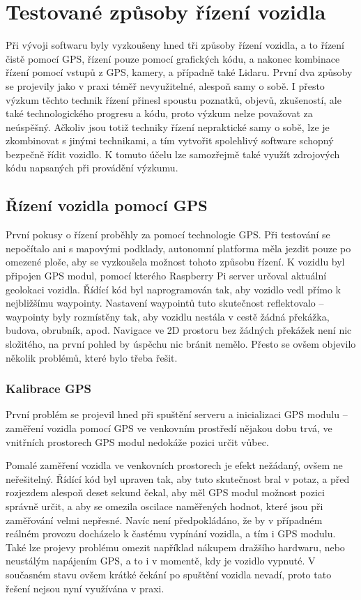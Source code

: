 \documentclass[czech,bachelor,dept460,male,cpp,cpdeclaration]{diploma}
\begin{document}
\section{Testované způsoby řízení vozidla} \label{driving-methods}

Při vývoji softwaru byly vyzkoušeny hned tři způsoby řízení vozidla, a to řízení čistě pomocí GPS, řízení pouze pomocí grafických
kódu, a nakonec kombinace řízení pomocí vstupů z GPS, kamery, a případně také Lidaru. První dva způsoby se projevily jako v praxi 
téměř nevyužitelné, alespoň samy o sobě. I přesto výzkum těchto technik řízení přinesl spoustu poznatků, objevů, zkušeností, ale 
také technologického progresu a kódu, proto výzkum nelze považovat za neúspěšný. Ačkoliv jsou totiž techniky řízení nepraktické
samy o sobě, lze je zkombinovat s jinými technikami, a tím vytvořit spolehlivý software schopný bezpečně řídit vozidlo. K tomuto
účelu lze samozřejmě také využít zdrojových kódu napsaných při provádění výzkumu.

\subsection{Řízení vozidla pomocí GPS} \label{gps-failure}

První pokusy o řízení proběhly za pomocí technologie GPS. Při testování se nepočítalo ani s mapovými podklady, autonomní platforma
měla jezdit pouze po omezené ploše, aby se vyzkoušela možnost tohoto způsobu řízení. K vozidlu byl připojen GPS modul, pomocí
kterého Raspberry Pi server určoval aktuální geolokaci vozidla. Řídící kód byl naprogramován tak, aby vozidlo vedl přímo 
k nejbližšímu waypointy. Nastavení waypointů tuto skutečnost reflektovalo -- waypointy byly rozmístěny tak, aby vozidlu nestála 
v cestě žádná překážka, budova, obrubník, apod. Navigace ve 2D prostoru bez žádných překážek není nic složitého, na první pohled
by úspěchu nic bránit nemělo. Přesto se ovšem objevilo několik problémů, které bylo třeba řešit.


\subsubsection{Kalibrace GPS}

První problém se projevil hned při spuštění serveru a inicializaci GPS modulu -- zaměření vozidla pomocí GPS ve venkovním 
prostředí nějakou dobu trvá, ve vnitřních prostorech GPS modul nedokáže pozici určit vůbec.

Pomalé zaměření vozidla ve venkovních prostorech je efekt nežádaný, ovšem ne neřešitelný. Řídící kód byl upraven tak, aby tuto 
skutečnost bral v potaz, a před rozjezdem alespoň deset sekund čekal, aby měl GPS modul možnost pozici správně určit, a aby se 
omezila oscilace naměřených hodnot, které jsou při zaměřování velmi nepřesné. Navíc není předpokládáno, že by v případném reálném 
provozu docházelo k častému vypínání vozidla, a tím i GPS modulu. Také lze projevy problému omezit například nákupem dražšího 
hardwaru, nebo neustálým napájením GPS, a to i v momentě, kdy je vozidlo vypnuté. V současném stavu ovšem krátké čekání 
po spuštění vozidla nevadí, proto tato řešení nejsou nyní využívána v praxi.
\end{document}
